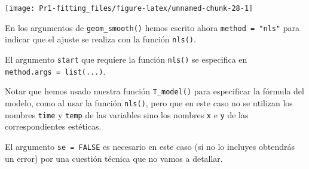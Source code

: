 \documentclass[
  degree=mecinf,
  title=normal,
  toc=normal,
  bib=normal]{mnye}
\begin{document}
\begin{center}\texttt{[image: Pr1-fitting\_files/figure-latex/unnamed-chunk-28-1]} \end{center}

En los argumentos de \texttt{geom\_smooth()} hemos escrito ahora \texttt{method\ =\ "nls"} para indicar que el ajuste se realiza con la función \texttt{nls()}.

El argumento \texttt{start} que requiere la función \texttt{nls()} se especifica en \texttt{method.args\ =\ list(...)}.

Notar que hemos usado nuestra función \texttt{T\_model()} para especificar la fórmula del modelo, como al usar la función \texttt{nls()}, pero que en este caso no se utilizan los nombres \texttt{time} y \texttt{temp} de las variables sino los nombres \texttt{x} e \texttt{y} de las correspondientes estéticas.

El argumento \texttt{se\ =\ FALSE} es necesario en este caso (si no lo incluyes obtendrás un error) por una cuestión técnica que no vamos a detallar.

\end{document}
